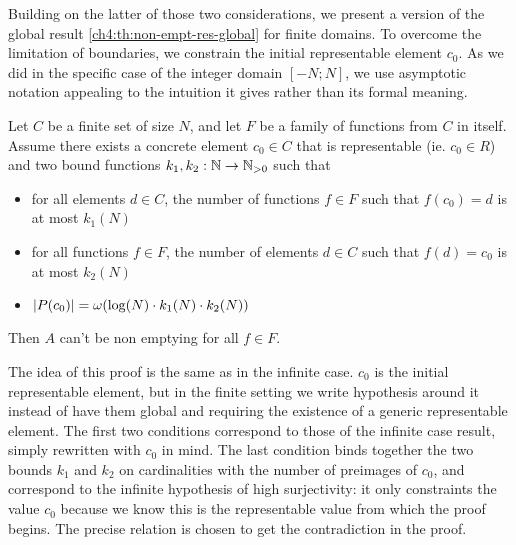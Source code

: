 Building on the latter of those two considerations, we present a version of the global result \ref{ch4:th:non-empt-res-global} for finite domains. To overcome the limitation of boundaries, we constrain the initial representable element $c_0$. As we did in the specific case of the integer domain $[-N; N]$, we use asymptotic notation appealing to the intuition it gives rather than its formal meaning.
\begin{theorem}\label{ch4:th:non-empt-res-finite-global}
	Let $C$ be a finite set of size $N$, and let $F$ be a family of functions from $C$ in itself. Assume there exists a concrete element $c_0 \in C$ that is representable (ie. $c_0 \in R$) and two bound functions $k_1, k_2 : \mathbb{N} \rightarrow \mathbb{N}_{>0}$ such that
	\begin{itemize}
		\item for all elements $d \in C$, the number of functions $f \in F$ such that $f(c_0) = d$ is at most $k_1(N)$
		\item for all functions $f \in F$, the number of elements $d \in C$ such that $f(d) = c_0$ is at most $k_2(N)$
		\item $\lvert P(c_0)\rvert = \omega(\log(N) \cdot k_1(N) \cdot k_2(N))$
	\end{itemize}
	Then $A$ can't be non emptying for all $f \in F$.
\end{theorem}
The idea of this proof is the same as in the infinite case. $c_0$ is the initial representable element, but in the finite setting we write hypothesis around it instead of have them global and requiring the existence of a generic representable element. The first two conditions correspond to those of the infinite case result, simply rewritten with $c_0$ in mind. The last condition binds together the two bounds $k_1$ and $k_2$ on cardinalities with the number of preimages of $c_0$, and correspond to the infinite hypothesis of high surjectivity: it only constraints the value $c_0$ because we know this is the representable value from which the proof begins. The precise relation is chosen to get the contradiction in the proof.
